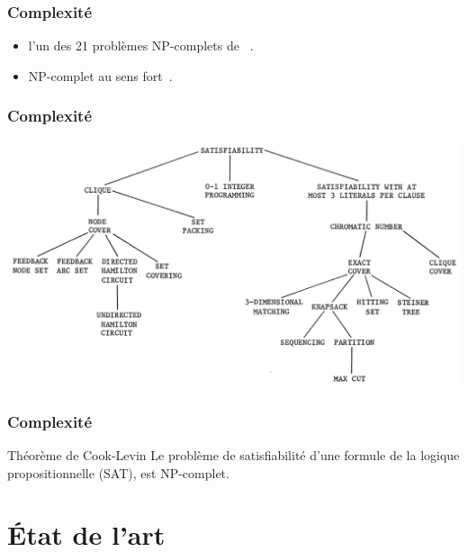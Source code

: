 \documentclass[aspectratio=169,11pt]{beamer}
\begin{document}

	\begin{frame}
		\frametitle{Complexité}
		\begin{block}{}
			\begin{itemize}
				\item l'un des 21 problèmes NP-complets de \citeauthor{Karp1972}~\cite{Karp1972}.
				\item NP-complet au sens fort~\cite{garey2002computers}.
			\end{itemize}
		\end{block}
		\begin{exampleblock}{}
		\end{exampleblock}
	\end{frame}

	\begin{frame}
		\frametitle{Complexité}
		\centering
		\includegraphics[width=0.9\linewidth]{karp_reduction_tree}%
	\end{frame}

	\begin{frame}
		\frametitle{Complexité}
		\begin{block}{Théorème de Cook-Levin}
			Le problème de satisfiabilité d'une formule de la logique propositionnelle (SAT), est NP-complet.
		\end{block}
		\begin{exampleblock}{}
			\fullcite{Cook1971}
		\end{exampleblock}
	\end{frame}

	\section{État de l'art}
\end{document}
